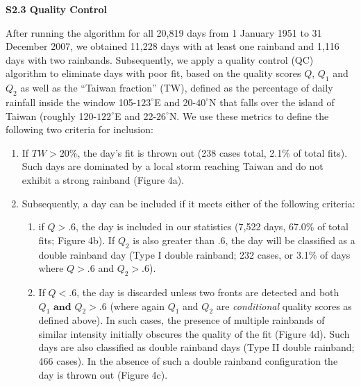 \documentclass[final,grl]{agutexSI}
\begin{document}
\begin{article}
\vspace{3mm}

\noindent\textbf{S2.3 Quality Control}

After running the algorithm for all 20,819 days from 1 January 1951 to 31 December 2007, we obtained 11,228 days with at least one rainband and 1,116 days with two rainbands. Subsequently, we apply a quality control (QC) algorithm to eliminate days with poor fit, based on the quality scores $Q$, $Q_1$ and $Q_2$ as well as the ``Taiwan fraction'' (TW), defined as the percentage of daily rainfall inside the window 105-$123^{\circ}$E and 20-$40^{\circ}$N that falls over the island of Taiwan (roughly 120-$122^{\circ}$E and 22-$26^{\circ}$N. We use these metrics to define the following two criteria for inclusion:

\begin{enumerate}

	\item If $TW > 20\%$, the day's fit is thrown out (238 cases total, 2.1\% of total fits). Such days are dominated by a local storm reaching Taiwan and do not exhibit a strong rainband (Figure 4a).  
	
	\item Subsequently, a day can be included if it meets either of the following criteria:
	
	\begin{enumerate} 
	
	\item if $Q>.6$, the day is included in our statistics (7,522 days, 67.0\% of total fits; Figure 4b). If $Q_2$ is also greater than .6, the day will be classified as a double rainband day (Type I double rainband; 232 cases, or 3.1\% of days where $Q>.6$ and $Q_2>.6$).
		
	\item If $Q<.6$, the day is discarded unless two fronts are detected and both $Q_1 \mathrm{\textbf{ and }} Q_2 > .6$ (where again $Q_1$ and $Q_2$ are \textit{conditional} quality scores as defined above). In such cases, the presence of multiple rainbands of similar intensity initially obscures the quality of the fit (Figure 4d). Such days are also classified as double rainband days (Type II double rainband; 466 cases). In the absence of such a double rainband configuration the day is thrown out (Figure 4c).
	
	\end{enumerate}
	
\end{enumerate}	


\end{article}
\end{document}
